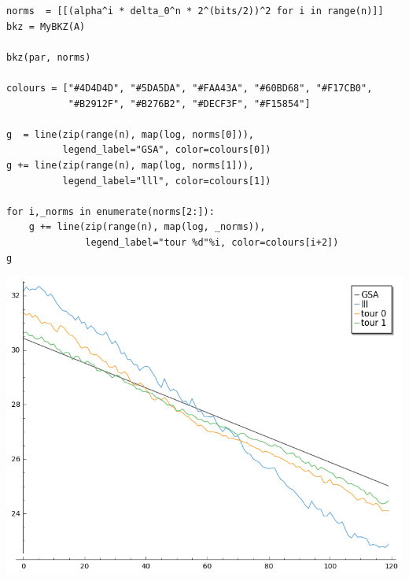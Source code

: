 \documentclass[10pt,a4paper,nobib]{tufte-handout}
\begin{document}
\begin{lstlisting}
norms  = [[(alpha^i * delta_0^n * 2^(bits/2))^2 for i in range(n)]]
bkz = MyBKZ(A)

bkz(par, norms)
        
colours = ["#4D4D4D", "#5DA5DA", "#FAA43A", "#60BD68", "#F17CB0",
           "#B2912F", "#B276B2", "#DECF3F", "#F15854"]

g  = line(zip(range(n), map(log, norms[0])),
          legend_label="GSA", color=colours[0])
g += line(zip(range(n), map(log, norms[1])),
          legend_label="lll", color=colours[1])

for i,_norms in enumerate(norms[2:]):
    g += line(zip(range(n), map(log, _norms)),
              legend_label="tour %d"%i, color=colours[i+2])
g
\end{lstlisting}

\begin{center}
\includegraphics[width=.9\linewidth]{lab-02-solution-plot-gsa-3.png}
\end{center}
\end{document}
